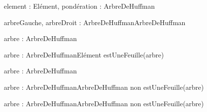 \begin{algorithme}
	
	{element : Elément, pondération : \naturel}{ArbreDeHuffman}{}

	{arbreGauche, arbreDroit : ArbreDeHuffman}{ArbreDeHuffman}{}

	{arbre : ArbreDeHuffman}{\naturel}{}

	{arbre : ArbreDeHuffman}{Elément}
	{estUneFeuille(arbre)}

	{arbre : ArbreDeHuffman}{\booleen}{}

	{arbre : ArbreDeHuffman}{ArbreDeHuffman}
	{non estUneFeuille(arbre)}
	
	{arbre : ArbreDeHuffman}{ArbreDeHuffman}
	{non estUneFeuille(arbre)}

\end{algorithme}

